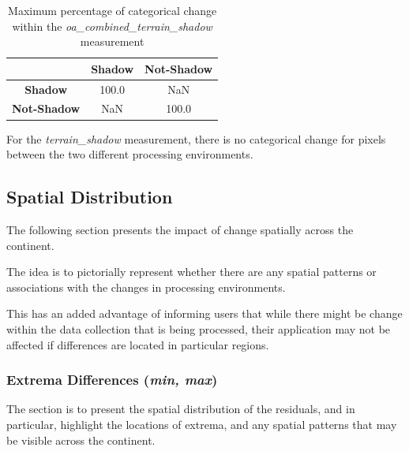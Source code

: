 \documentclass[a4paper]{article}
\begin{document}
    \begin{table}[ht!]
      \caption{Maximum percentage of categorical change within the \textit{oa\_combined\_terrain\_shadow} measurement}\label{table:12}
      \centering
      \begin{tabular}{ccc} \midrule
        & \textbf{Shadow} & \textbf{Not-Shadow} \\ \midrule
        \textbf{Shadow} & 100.0 & NaN \\
        \textbf{Not-Shadow} & NaN & 100.0 \\
      \end{tabular}
    \end{table}

    \begin{flushleft}
      For the \textit{terrain\_shadow} measurement, there is no categorical change for pixels between the two different processing environments.
    \end{flushleft}

    \subsection{Spatial Distribution}

      \begin{flushleft}
        The following section presents the impact of change spatially across the continent. \par
        The idea is to pictorially represent whether there are any spatial patterns or associations with the changes in processing environments. \par
        This has an added advantage of informing users that while there might be change within the data collection that is being processed, their application may not be affected if differences are located in particular regions.
      \end{flushleft}

  \clearpage

    \subsubsection{Extrema Differences (\textit{min, max})}

      \begin{flushleft}
        The section is to present the spatial distribution of the residuals, and in particular, highlight the locations of extrema, and any spatial patterns that may be visible across the continent. \par
      \end{flushleft}
\end{document}
